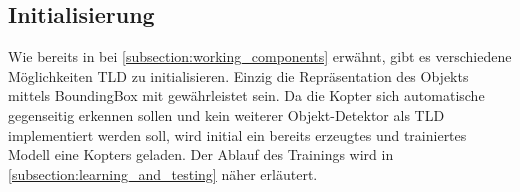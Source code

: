 	\subsection{Initialisierung}
	\label{subsection:tld_init}
	Wie bereits in bei \ref{subsection:working_components} erwähnt, gibt es verschiedene Möglichkeiten TLD zu initialisieren. Einzig die Repräsentation des Objekts mittels BoundingBox mit gewährleistet sein. Da die Kopter sich automatische gegenseitig erkennen sollen und kein weiterer Objekt-Detektor als TLD implementiert werden soll, wird initial ein bereits erzeugtes und trainiertes Modell eine Kopters geladen. Der Ablauf des Trainings wird in \ref{subsection:learning_and_testing} näher erläutert.